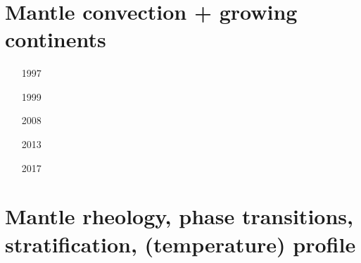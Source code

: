 \begin{small}
\begin{itemize}
 \\
 \\
 \\
 \\
\item[\twothousandtwentyone] 
 \\
\item[\twothousandtwentytwo] 
 \\ 
\item[\twothousandtwentythree] 
 \\ 
\item[\twothousandtwentyfour] 
 \\ 
 \\ 
\end{itemize}
\end{small}

\section{Mantle convection + growing continents}

\begin{small}
\begin{itemize}
\item[1997]
\item[1999]
\item[2008]
\item[2013]
\item[2017]
\end{itemize}
\end{small}

\section{Mantle rheology, phase transitions, stratification, (temperature) profile}

